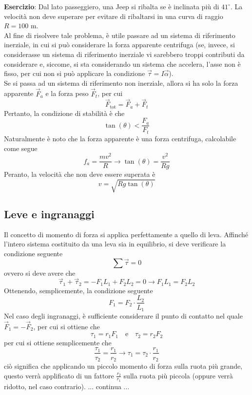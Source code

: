 \documentclass[a4paper]{extarticle}
\begin{document}
\vspace{1em}
\noindent
\textbf{Esercizio}: Dal lato passeggiero, una Jeep si ribalta se è inclinata più di $41^\circ$. La velocità non deve superare per evitare di ribaltarsi in una curva di raggio $R=100$ m.\\
Al fine di risolvere tale problema, è utile passare ad un sistema di riferimento inerziale, in cui si può considerare la forza apparente centrifuga (se, invece, si considerasse un sistema di riferimento inerziale vi sarebbero troppi contributi da considerare e, siccome, si sta considerando un sistema che accelera, l'asse non è fisso, per cui non si può applicare la condizione $\vec \tau = I \vec \alpha$).\\
Se si passa ad un sistema di riferimento non inerziale, allora si ha solo la forza apparente $\vec F_a$ e la forza peso $\vec F_t$, per cui
\[\vec F_{\text{tot}} = \vec F_a + \vec F_t\]
Pertanto, la condizione di stabilità è che
\[\tan(\theta) < \frac{F_a}{F_t}\]
Naturalmente è noto che la forza apparente è una forza centrifuga, calcolabile come segue
\[f_a=\frac{mv^2}{R} \longrightarrow \tan(\theta)=\frac{v^2}{Rg}\]
Peranto, la velocità che non deve essere superata è
\[\boxed{v=\sqrt{Rg\tan(\theta)}}\]

\vspace{1em}
\subsection{Leve e ingranaggi}
Il concetto di momento di forza si applica perfettamente a quello di leva. Affinché l'intero sistema costituito da una leva sia in equilibrio, si deve verificare la condizione seguente
\[\sum \vec \tau = 0\]
ovvero si deve avere che
\[\vec \tau_1 + \vec \tau_2 = -F_1 L_1 + F_2 L_2 = 0 \longrightarrow F_1 L_1 = F_2 L_2\]
Ottenendo, semplicemente, la condizione seguente
\[\boxed{F_1=F_2 \cdot \frac{L_2}{L_1}}\]
Nel caso degli ingranaggi, è sufficiente considerare il punto di contatto nel quale $\vec F_1 = - \vec F_2$, per cui si ottiene che
\[\tau_1 = r_1 F_1 \hspace{1em} \text{e} \hspace{1em} \tau_2 = r_2 F_2\]
per cui si ottiene semplicemente che
\[\boxed{\frac{\tau_1}{\tau_2}=\frac{r_1}{r_2} \longrightarrow \tau_1=\tau_2 \cdot \frac{r_1}{r_2}}\]
ciò significa che applicando un piccolo momento di forza sulla ruota più grande, questo verrà applificato di un fattore $\frac{r_2}{r_1}$ sulla ruota più piccola (oppure verrà ridotto, nel caso contrario).
... continua ...
\end{document}
